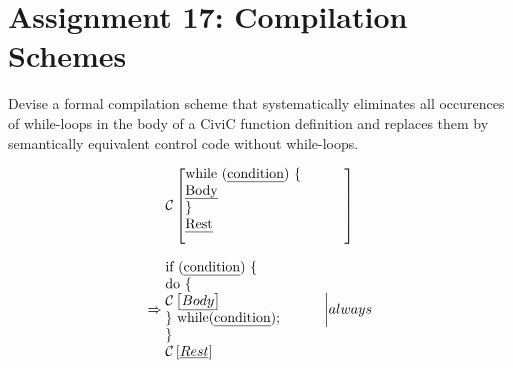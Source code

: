 \documentclass[12pt]{article}
\begin{document}
\section*{Assignment 17: Compilation Schemes}

Devise a formal compilation scheme that systematically eliminates all occurences of
while-loops in the body of a CiviC function definition and replaces them by semantically equivalent control code without while-loops.

\begin{equation}
\mathcal{C} \left[
\parbox{4cm}{
while (\emph{condition}) \{\\
	\emph{Body}\\
\}\\
\emph{Rest}\\
}
\right]
\end{equation}

\begin{equation}
\Rightarrow \parbox{4cm}{
if (\emph{condition}) \{\\
	do \{\\
		$\mathcal{C} \left[ \emph{Body} \right]$ \\
	\} while(\emph{condition});\\
\}\\
$\mathcal{C} \left[ \emph{Rest} \right]$
}
\bigg| always
\end{equation}
\end{document}
